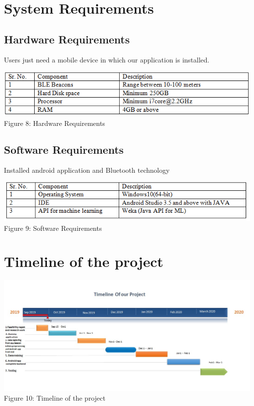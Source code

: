 \documentclass{article}
\begin{document}
\section{System Requirements}
\subsection{Hardware Requirements}
Users just need a mobile device in which our application is installed.
\begin{center}
\includegraphics[scale=0.8]{table2}
\\Figure 8: Hardware Requirements
\end{center}
\subsection{Software Requirements}
Installed android application and Bluetooth technology 

\begin{center}
\includegraphics[scale=0.8]{table1}
\\Figure 9: Software Requirements
\end{center}


\section{Timeline of the project}
\begin{center}
\includegraphics[scale=0.5]{timeline}
\\Figure 10: Timeline of the project
\end{center}
\end{document}
